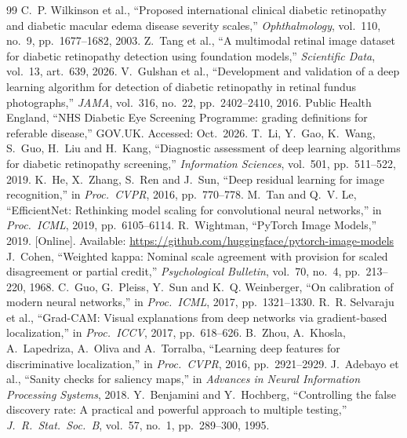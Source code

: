 \documentclass[11pt,a4paper]{article}
\begin{document}
\begin{thebibliography}{99}
\small
\setlength{\itemsep}{1pt}
 C.~P. Wilkinson et al., ``Proposed international clinical diabetic retinopathy and diabetic macular edema disease severity scales,'' \emph{Ophthalmology}, vol.~110, no.~9, pp.~1677--1682, 2003.
 Z.~Tang et al., ``A multimodal retinal image dataset for diabetic retinopathy detection using foundation models,'' \emph{Scientific Data}, vol.~13, art.~639, 2026.
 V.~Gulshan et al., ``Development and validation of a deep learning algorithm for detection of diabetic retinopathy in retinal fundus photographs,'' \emph{JAMA}, vol.~316, no.~22, pp.~2402--2410, 2016.
 Public Health England, ``NHS Diabetic Eye Screening Programme: grading definitions for referable disease,'' GOV.UK. Accessed: Oct.\ 2026.
 T.~Li, Y.~Gao, K.~Wang, S.~Guo, H.~Liu and H.~Kang, ``Diagnostic assessment of deep learning algorithms for diabetic retinopathy screening,'' \emph{Information Sciences}, vol.~501, pp.~511--522, 2019.
 K.~He, X.~Zhang, S.~Ren and J.~Sun, ``Deep residual learning for image recognition,'' in \emph{Proc.\ CVPR}, 2016, pp.~770--778.
 M.~Tan and Q.~V. Le, ``EfficientNet: Rethinking model scaling for convolutional neural networks,'' in \emph{Proc.\ ICML}, 2019, pp.~6105--6114.
 R.~Wightman, ``PyTorch Image Models,'' 2019. [Online]. Available: \url{https://github.com/huggingface/pytorch-image-models}
 J.~Cohen, ``Weighted kappa: Nominal scale agreement with provision for scaled disagreement or partial credit,'' \emph{Psychological Bulletin}, vol.~70, no.~4, pp.~213--220, 1968.
 C.~Guo, G.~Pleiss, Y.~Sun and K.~Q. Weinberger, ``On calibration of modern neural networks,'' in \emph{Proc.\ ICML}, 2017, pp.~1321--1330.
 R.~R. Selvaraju et al., ``Grad-CAM: Visual explanations from deep networks via gradient-based localization,'' in \emph{Proc.\ ICCV}, 2017, pp.~618--626.
 B.~Zhou, A.~Khosla, A.~Lapedriza, A.~Oliva and A.~Torralba, ``Learning deep features for discriminative localization,'' in \emph{Proc.\ CVPR}, 2016, pp.~2921--2929.
 J.~Adebayo et al., ``Sanity checks for saliency maps,'' in \emph{Advances in Neural Information Processing Systems}, 2018.
 Y.~Benjamini and Y.~Hochberg, ``Controlling the false discovery rate: A practical and powerful approach to multiple testing,'' \emph{J.\ R.\ Stat.\ Soc.\ B}, vol.~57, no.~1, pp.~289--300, 1995.

\end{thebibliography}
\end{document}
